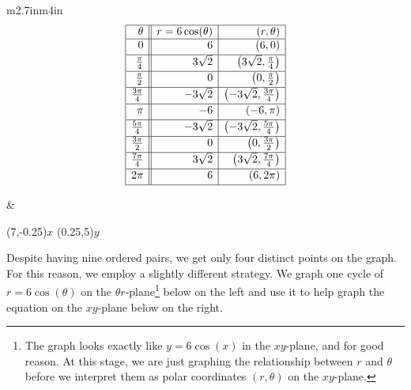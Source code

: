 \documentclass{ximera}
\begin{document}
\hspace{.25in} \begin{tabular}{m{2.7in}m{4in}}
\setlength{\extrarowheight}{2pt}
\[ \begin{array}{|r||r|r|}  

\hline

\theta & r = 6\cos(\theta) & (r,\theta) \\ \hline
0  & 6 & (6,0) \\ [2pt]   \hline
\frac{\pi}{4}  & 3\sqrt{2} & \left(3\sqrt{2}, \frac{\pi}{4}\right) \\ [2pt] \hline 
\frac{\pi}{2}  & 0 & \left(0,\frac{\pi}{2}\right) \\ [2pt] \hline 
\frac{3\pi}{4}  & -3\sqrt{2} & \left(-3\sqrt{2}, \frac{3\pi}{4}\right) \\ [2pt] \hline 
\pi & -6 & (-6,\pi) \\ [2pt] \hline 
\frac{5\pi}{4}  & -3\sqrt{2} & \left(-3\sqrt{2}, \frac{5\pi}{4}\right) \\ [2pt] \hline 
\frac{3\pi}{2}  & 0 & \left(0, \frac{3\pi}{2} \right) \\ [2pt] \hline 
\frac{7\pi}{4}  & 3\sqrt{2} & \left(3\sqrt{2}, \frac{7\pi}{4}\right) \\ [2pt] \hline 
2\pi  & 6 & (6,2\pi) \\  [2pt] \hline
\end{array} \]
\setlength{\extrarowheight}{0pt}

& 
\hspace*{.5in}
\begin{mfpic}[15]{-3}{7}{-5}{5}
\axes
{}
\tlabel[cc](7,-0.25){\scriptsize $x$}
\tlabel[cc](0.25,5){\scriptsize $y$}
\tlpointsep{4pt}
\scriptsize
{}
\normalsize
\end{mfpic}

\end{tabular}

Despite having nine ordered pairs, we get only four distinct points on the graph.  For this reason, we employ a slightly different strategy.  We graph one cycle of $r = 6\cos(\theta)$ on the $\theta r$-plane\footnote{The graph looks exactly like $y = 6\cos(x)$ in the $xy$-plane, and for good reason. At this stage, we are just graphing the relationship between $r$ and $\theta$ before we interpret them as polar coordinates $(r,\theta)$ on the $xy$-plane.} below on the left and use it to help graph the equation on the $xy$-plane below on the right.  
\end{document}
